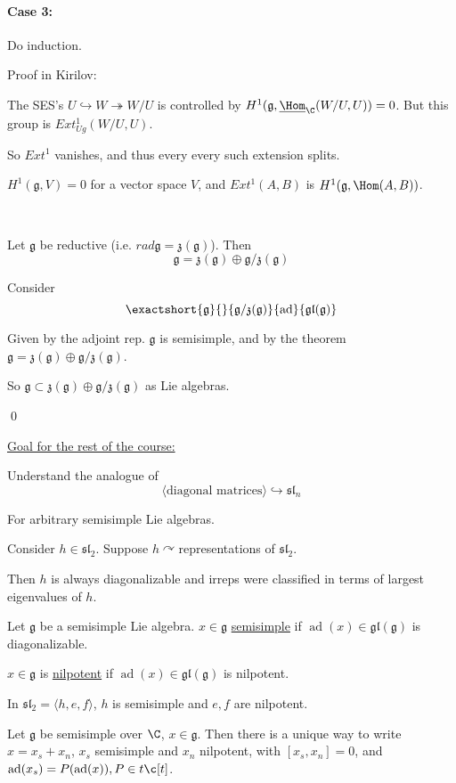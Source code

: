 \documentclass[x11names,reqno,14pt]{extarticle}
\newcommand{\mk}[1]{\mathfrak{#1}}
\newcommand{\g}{\mk{g}}
\newcommand{\rad}{rad}
\DeclareMathOperator{\ad}{ad}
\newcommand{\onto}{\twoheadrightarrow}
\newcommand{\into}{\hookrightarrow}
\newcommand{\gl}{\mk{g}\mk{l}}
\renewcommand{\sl}{\mk{s}\mk{l}}
\begin{document}
\paragraph{Case 3:} Do induction. 

Proof in Kirilov: 

The SES's $U\into W \onto W/U$ is controlled by $H^1(\g,\underline{\Hom}_\C(W/U,U)) = 0$. But this group is $Ext^1_{Ug}(W/U,U)$. 

So $Ext^1$ vanishes, and thus every every such extension splits. 

$H^1(\g,V) = 0$ for a vector space $V$, and $Ext^1(A,B)$ is $H^1(\g,\Hom(A,B))$. 

\

\cor

Let $\g$ be reductive (i.e. $\rad \g = \mk{z}(\g)$). Then 
\[
\g = \mk{z}(\g)\oplus\g/\mk{z}(\g)
\]

\proof

Consider 
\[
\exactshort{\g}{}{\g/\mk{z}(\g)}{\ad}{\gl(\g)}
\]

Given by the adjoint rep. $\g$ is semisimple, and by the theorem $\g = \mk{z}(\g) \oplus \g/\mk{z}(\g)$. 

So $\g \subset \mk{z}(\g) \oplus \g/\mk{z}(\g)$ as Lie algebras. 

\qed

\underline{Goal for the rest of the course:}

Understand the analogue of 
\[
\langle\text{diagonal matrices}\rangle\into \sl_n
\]

For arbitrary semisimple Lie algebras. 

\exm

Consider $h\in \sl_2$. Suppose $h\curvearrowright $representations of $\sl_2$. 

Then $h$ is always diagonalizable and irreps were classified in terms of largest eigenvalues of $h$. 


Let $\g$ be a semisimple Lie algebra. $x \in \g$ \underline{semisimple} if $\ad(x) \in \gl(\g)$ is diagonalizable. 

$x \in \g$ is \underline{nilpotent} if $\ad(x) \in \gl(\g)$ is nilpotent. 

\exm

In $\sl_2 = \langle h, e, f \rangle$, $h$ is semisimple and $e, f$ are nilpotent. 

\thm

Let $\g$ be semisimple over $\C$, $x \in \g$. Then there is a unique way to write $x = x_s + x_n$, $x_s$ semisimple and $x_n$ nilpotent, with $[x_s,x_n] = 0$, and $\ad(x_s) = P(\ad(x)), P \in t\c[t]$. 
\end{document}
